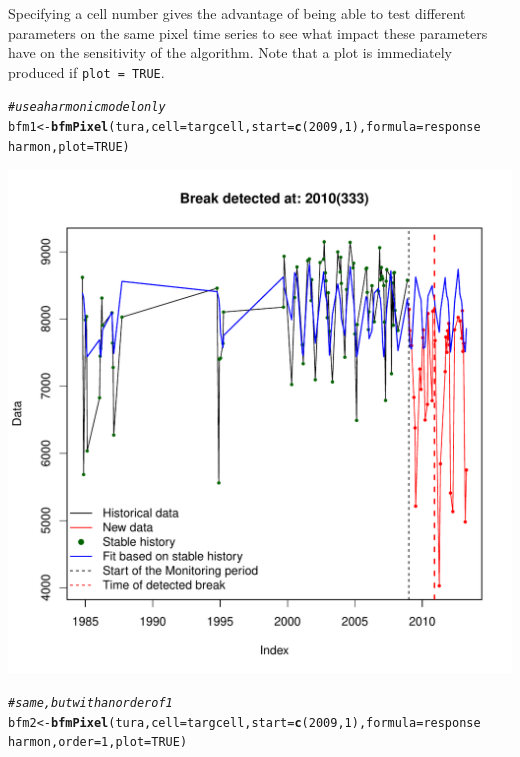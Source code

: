 \documentclass{article}\usepackage[]{graphicx}\usepackage[]{color}
\makeatletter
\def\maxwidth{ %
  \ifdim\Gin@nat@width>\linewidth
    \linewidth
  \else
    \Gin@nat@width
  \fi
}
\newcommand{\hlnum}[1]{\textcolor[rgb]{0.686,0.059,0.569}{#1}}%
\newcommand{\hlcom}[1]{\textcolor[rgb]{0.678,0.584,0.686}{\textit{#1}}}%
\newcommand{\hlopt}[1]{\textcolor[rgb]{0,0,0}{#1}}%
\newcommand{\hlstd}[1]{\textcolor[rgb]{0.345,0.345,0.345}{#1}}%
\newcommand{\hlkwb}[1]{\textcolor[rgb]{0.69,0.353,0.396}{#1}}%
\newcommand{\hlkwc}[1]{\textcolor[rgb]{0.333,0.667,0.333}{#1}}%
\newcommand{\hlkwd}[1]{\textcolor[rgb]{0.737,0.353,0.396}{\textbf{#1}}}%
\newenvironment{kframe}{%
 \def\at@end@of@kframe{}%
 \ifinner\ifhmode%
  \def\at@end@of@kframe{\end{minipage}}%
  \begin{minipage}{\columnwidth}%
 \fi\fi%
 \def\FrameCommand##1{\hskip\@totalleftmargin \hskip-\fboxsep
 \colorbox{shadecolor}{##1}\hskip-\fboxsep
     \hskip-\linewidth \hskip-\@totalleftmargin \hskip\columnwidth}%
 \MakeFramed {\advance\hsize-\width
   \@totalleftmargin\z@ \linewidth\hsize
   \@setminipage}}%
 {\par\unskip\endMakeFramed%
 \at@end@of@kframe}
\newenvironment{knitrout}{}{} %
\def\code#1{\texttt{#1}}
\makeatother
\begin{document}
Specifying a cell number gives the advantage of being able to test different parameters on the same pixel time series to see what impact these parameters have on the sensitivity of the algorithm. Note that a plot is immediately produced if \code{plot = TRUE}.

\begin{knitrout}
\color{fgcolor}\begin{kframe}
\begin{alltt}
\hlcom{# use a harmonic model only}
\hlstd{bfm1} \hlkwb{<-} \hlkwd{bfmPixel}\hlstd{(tura,} \hlkwc{cell} \hlstd{= targcell,} \hlkwc{start} \hlstd{=} \hlkwd{c}\hlstd{(}\hlnum{2009}\hlstd{,} \hlnum{1}\hlstd{),} \hlkwc{formula} \hlstd{= response} \hlopt{~}
    \hlstd{harmon,} \hlkwc{plot} \hlstd{=} \hlnum{TRUE}\hlstd{)}
\end{alltt}
\end{kframe}
\includegraphics[width=\maxwidth]{figure/bfmPixel-args1} 
\begin{kframe}\begin{alltt}
\hlcom{# same, but with an order of 1}
\hlstd{bfm2} \hlkwb{<-} \hlkwd{bfmPixel}\hlstd{(tura,} \hlkwc{cell} \hlstd{= targcell,} \hlkwc{start} \hlstd{=} \hlkwd{c}\hlstd{(}\hlnum{2009}\hlstd{,} \hlnum{1}\hlstd{),} \hlkwc{formula} \hlstd{= response} \hlopt{~}
    \hlstd{harmon,} \hlkwc{order} \hlstd{=} \hlnum{1}\hlstd{,} \hlkwc{plot} \hlstd{=} \hlnum{TRUE}\hlstd{)}

\end{alltt}
\end{kframe}
\end{knitrout}
\end{document}

